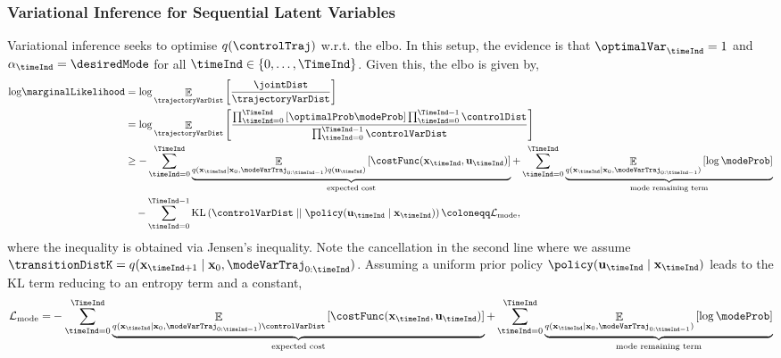 \documentclass{mimosis-class/mimosis}
\numberwithin{equation}{chapter}
\DeclareMathOperator{\E}{\mathbb{E}}
\newcommand{\state}{\ensuremath{\mathbf{x}}}
\newcommand{\control}{\ensuremath{\mathbf{u}}}
\newcommand{\modeVar}{\ensuremath{\alpha}}
\begin{document}
{\subsubsection{Variational Inference for Sequential Latent Variables}
\label{sec:orgd872a53}
Variational inference seeks to optimise \(q(\controlTraj)\)
w.r.t. the \acrfull{elbo}.
In this setup, the evidence is that \(\optimalVar_{\timeInd}=1\) and \(\modeVar_{\timeInd}=\desiredMode\) for
all \(\timeInd \in \{0,\ldots,\TimeInd\}\).
Given this, the \acrshort{elbo} is given by,
\begin{align} \label{eq-}
\text{log} \marginalLikelihood
&= \text{log} \E_{\trajectoryVarDist} \left[ \frac{\jointDist}{\trajectoryVarDist} \right] \nonumber \\
&= \text{log} \E_{\trajectoryVarDist} \left[
\frac{\prod_{\timeInd=0}^{\TimeInd} \left[\optimalProb \modeProb \right]
\prod_{\timeInd=0}^{\TimeInd-1}\controlDist}{\prod_{\timeInd=0}^{\TimeInd-1}  \controlVarDist}
\right] \nonumber \\
&\geq - \sum_{\timeInd=0}^{\TimeInd}
\underbrace{\E_{q(\state_{\timeInd}\mid \state_0, \modeVarTraj_{0:\timeInd-1}) q(\control_{\timeInd} )}
\left[ \costFunc(\state_\timeInd, \control_\timeInd) \right]}_{\text{expected cost}}
+ \sum_{\timeInd=0}^{\TimeInd}
\underbrace{\E_{ q(\state_{\timeInd} \mid \state_0, \modeVarTraj_{0:\timeInd-1})}
\left[ \log \modeProb\right]}_{\text{mode remaining term}} \nonumber \\
&\quad - \sum_{\timeInd=0}^{\TimeInd-1}
\text{KL}\left(\controlVarDist \mid\mid \policy(\control_\timeInd \mid \state_\timeInd) \right)  \coloneqq \mathcal{L}_{\text{mode}},
\end{align}
where the inequality is obtained via Jensen's inequality.
Note the cancellation in the second line where
we assume \(\transitionDistK=q(\state_{\timeInd+1} \mid \state_0, \modeVarTraj_{0:\timeInd})\).
Assuming a uniform prior policy \(\policy(\control_\timeInd \mid \state_\timeInd)\) leads to the \(\text{KL}\)
term reducing to an entropy term and a constant,
\begin{align} \label{eq-traj-opt-elbo}
\mathcal{L}_{\text{mode}} = &-\sum_{\timeInd=0}^{\TimeInd}
\underbrace{\E_{q(\state_{\timeInd} \mid \state_0, \modeVarTraj_{0:\timeInd-1}) \controlVarDist }
\left[ \costFunc(\state_\timeInd, \control_\timeInd) \right]}_{\text{expected cost}}
+ \sum_{\timeInd=0}^{\TimeInd} \underbrace{\E_{ q(\state_{\timeInd} \mid \state_0, \modeVarTraj_{0:\timeInd-1})}
\left[
\log \modeProb \right]}_{\text{mode remaining term}} \nonumber \\

\end{align}}
\end{document}
